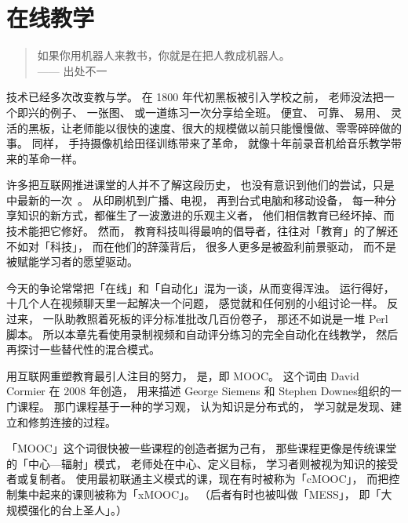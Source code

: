 \chapter{在线教学}\label{s:online}

\begin{quote}

  如果你用机器人来教书，你就是在把人教成机器人。\\
  —— 出处不一

\end{quote}

技术已经多次改变教与学。
在 1800 年代初黑板被引入学校之前，
老师没法把一个即兴的例子、
一张图、
或一道练习一次分享给全班。
便宜、
可靠、
易用、
灵活的黑板，让老师能以很快的速度、很大的规模做以前只能慢慢做、零零碎碎做的事。
同样，
手持摄像机给田径训练带来了革命，
就像十年前录音机给音乐教学带来的革命一样。

许多把互联网推进课堂的人并不了解这段历史，
也没有意识到他们的尝试，只是
中最新的一次~\cite{Watt2014}。
从印刷机到广播、电视，
再到台式电脑和移动设备，
每一种分享知识的新方式，都催生了一波激进的乐观主义者，
他们相信教育已经坏掉、而技术能把它修好。
然而，
教育科技叫得最响的倡导者，往往对「教育」的了解还不如对「科技」，
而在他们的辞藻背后，
很多人更多是被盈利前景驱动，
而不是被赋能学习者的愿望驱动。

今天的争论常常把「在线」和「自动化」混为一谈，从而变得浑浊。
运行得好，
十几个人在视频聊天里一起解决一个问题，
感觉就和任何别的小组讨论一样。
反过来，
一队助教照着死板的评分标准批改几百份卷子，
那还不如说是一堆 Perl 脚本。
所以本章先看使用录制视频和自动评分练习的完全自动化在线教学，
然后再探讨一些替代性的混合模式。


用互联网重塑教育最引人注目的努力，
是，即 MOOC。
这个词由 David Cormier 在 2008 年创造，
用来描述 George Siemens
和 Stephen Downes组织的一门课程。
那门课程基于一种的学习观，
认为知识是分布式的，
学习就是发现、建立和修剪连接的过程。

「MOOC」这个词很快被一些课程的创造者据为己有，
那些课程更像是传统课堂的「中心—辐射」模式，
老师处在中心、定义目标，
学习者则被视为知识的接受者或复制者。
使用最初联通主义模式的课，现在有时被称为「cMOOC」，
而把控制集中起来的课则被称为「xMOOC」。
（后者有时也被叫做「MESS」，
即「大规模强化的台上圣人」。）

